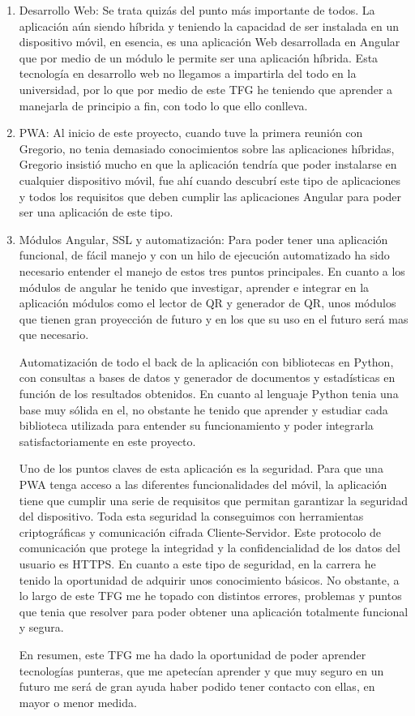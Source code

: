 \documentclass[a4paper, 12pt]{book}
\begin{document}
\begin{enumerate}
  \item Desarrollo Web: Se trata quizás del punto más importante de todos. La aplicación aún siendo híbrida y teniendo la capacidad de ser instalada en un dispositivo móvil, en esencia, es una aplicación Web desarrollada en Angular que por medio de un módulo le permite ser una aplicación híbrida. Esta tecnología en desarrollo web no llegamos a impartirla del todo en la universidad, por lo que por medio de este TFG he teniendo que aprender a manejarla de principio a fin, con todo lo que ello conlleva.
  
  \item PWA: Al inicio de este proyecto, cuando tuve la primera reunión con Gregorio, no tenia demasiado conocimientos sobre las aplicaciones híbridas, Gregorio insistió mucho en que la aplicación tendría que poder instalarse en cualquier dispositivo móvil, fue ahí cuando descubrí este tipo de aplicaciones y todos los requisitos que deben cumplir las aplicaciones Angular para poder ser una aplicación de este tipo.
  
	\item Módulos Angular, SSL y automatización: Para poder tener una aplicación funcional, de fácil manejo y con un hilo de ejecución automatizado ha sido necesario entender el manejo de estos tres puntos principales. En cuanto a los módulos de angular he tenido que investigar, aprender e integrar en la aplicación módulos como el lector de QR y generador de QR, unos módulos que tienen gran proyección de futuro y en los que su uso en el futuro será mas que necesario.
	
	Automatización de todo el back de la aplicación con bibliotecas en Python, con consultas a bases de datos y generador de documentos y estadísticas en función de los resultados obtenidos. En cuanto al lenguaje Python tenia una base muy sólida en el, no obstante he tenido que aprender y estudiar cada biblioteca utilizada para entender su funcionamiento y poder integrarla satisfactoriamente en este proyecto.

	Uno de los puntos claves de esta aplicación es la seguridad. Para que una PWA tenga acceso a las diferentes funcionalidades del móvil, la aplicación tiene que cumplir una serie de requisitos que permitan garantizar la seguridad del dispositivo. Toda esta seguridad la conseguimos con herramientas criptográficas y comunicación cifrada Cliente-Servidor. Este protocolo de comunicación que protege la integridad y la confidencialidad de los datos del usuario es HTTPS. En cuanto a este tipo de seguridad, en la carrera he tenido la oportunidad de adquirir unos conocimiento básicos. No obstante, a lo largo de este TFG me he topado con distintos errores, problemas y puntos que tenia que resolver para poder obtener una  aplicación totalmente funcional y segura.
	
En resumen, este TFG me ha dado la oportunidad de poder aprender tecnologías punteras, que me apetecían aprender y que muy seguro en un futuro me será de gran ayuda haber podido tener contacto con ellas, en mayor o menor medida.
\end{enumerate}
\end{document}
